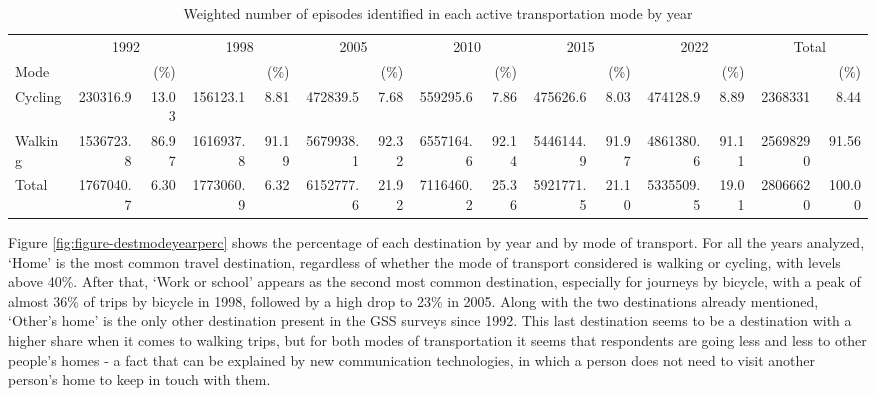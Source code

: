 \documentclass[preprint, 3p,
authoryear]{elsarticle} %
\begin{document}
\begingroup\fontsize{5}{7}\selectfont

\begin{longtable}[t]{lrrrrrrrrrrrrrr}
\caption{\label{tab:bulding table-01}\label{tab:episodes-count-percentages}Weighted number of episodes identified in each active transportation mode by year}\\
\toprule
\multicolumn{1}{c}{ } & \multicolumn{2}{c}{1992} & \multicolumn{2}{c}{1998} & \multicolumn{2}{c}{2005} & \multicolumn{2}{c}{2010} & \multicolumn{2}{c}{2015} & \multicolumn{2}{c}{2022} & \multicolumn{2}{c}{Total} \\
\cmidrule(l{3pt}r{3pt}){2-3} \cmidrule(l{3pt}r{3pt}){4-5} \cmidrule(l{3pt}r{3pt}){6-7} \cmidrule(l{3pt}r{3pt}){8-9} \cmidrule(l{3pt}r{3pt}){10-11} \cmidrule(l{3pt}r{3pt}){12-13} \cmidrule(l{3pt}r{3pt}){14-15}
Mode &  & (\%) &  & (\%) &  & (\%) &  & (\%) &  & (\%) &  & (\%) &  & (\%)\\
\midrule
Cycling & 230316.9 & 13.03 & 156123.1 & 8.81 & 472839.5 & 7.68 & 559295.6 & 7.86 & 475626.6 & 8.03 & 474128.9 & 8.89 & 2368331 & 8.44\\
Walking & 1536723.8 & 86.97 & 1616937.8 & 91.19 & 5679938.1 & 92.32 & 6557164.6 & 92.14 & 5446144.9 & 91.97 & 4861380.6 & 91.11 & 25698290 & 91.56\\
Total & 1767040.7 & 6.30 & 1773060.9 & 6.32 & 6152777.6 & 21.92 & 7116460.2 & 25.36 & 5921771.5 & 21.10 & 5335509.5 & 19.01 & 28066620 & 100.00\\
\bottomrule
\end{longtable}
\endgroup{}

Figure \ref{fig:figure-destmodeyearperc} shows the percentage of each
destination by year and by mode of transport. For all the years
analyzed, `Home' is the most common travel destination, regardless of
whether the mode of transport considered is walking or cycling, with
levels above 40\%. After that, `Work or school' appears as the second
most common destination, especially for journeys by bicycle, with a peak
of almost 36\% of trips by bicycle in 1998, followed by a high drop to
23\% in 2005. Along with the two destinations already mentioned,
`Other's home' is the only other destination present in the GSS surveys
since 1992. This last destination seems to be a destination with a
higher share when it comes to walking trips, but for both modes of
transportation it seems that respondents are going less and less to
other people's homes - a fact that can be explained by new communication
technologies, in which a person does not need to visit another person's
home to keep in touch with them.
\end{document}
